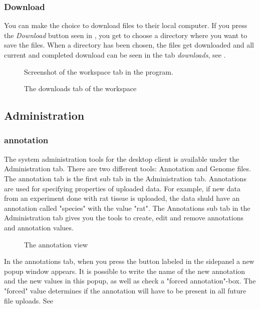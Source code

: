 \subsubsection{Download}
You can make the choice to download files to their local computer. If you press the \emph{Download} button seen in , you get to choose a directory where you want to save the files. When a directory has been chosen, the files get downloaded and all current and completed download can be seen in the tab \emph{downloads}, see .
\begin{figure}[htb]
	\caption{Screenshot of the workspace tab in the program.}
	\label{fig:des_workspace-view}
\end{figure}
\begin{figure}[htb]
	\caption{The downloads tab of the workspace}
	\label{fig:des_download-view}
\end{figure}
\FloatBarrier

\subsection{Administration}
\subsubsection{annotation}

The system administration tools for the desktop client is available under the Administration tab. There are two different tools: Annotation and Genome files. The annotation tab is the first sub tab in the Administration tab. Annotations are used for specifying properties of uploaded data. For example, if new data from an experiment done with rat tissue is uploaded, the data shuld have an annotation called "species" with the value "rat". The Annotations sub tab in the Administration tab gives you the tools to create, edit and remove annotations and annotation values. 
\begin{figure}[htb]
	\caption{The annotation view}
	\label{fig:annotationsView}
\end{figure}

In the annotations tab, when you press the button labeled  in the sidepanel a new popup window appears. It is possible to write the name of the new annotation and the new values in this popup, as well as check a "forced annotation"-box. The "forced" value determines if the annotation will have to be present in all future file uploads. See 

